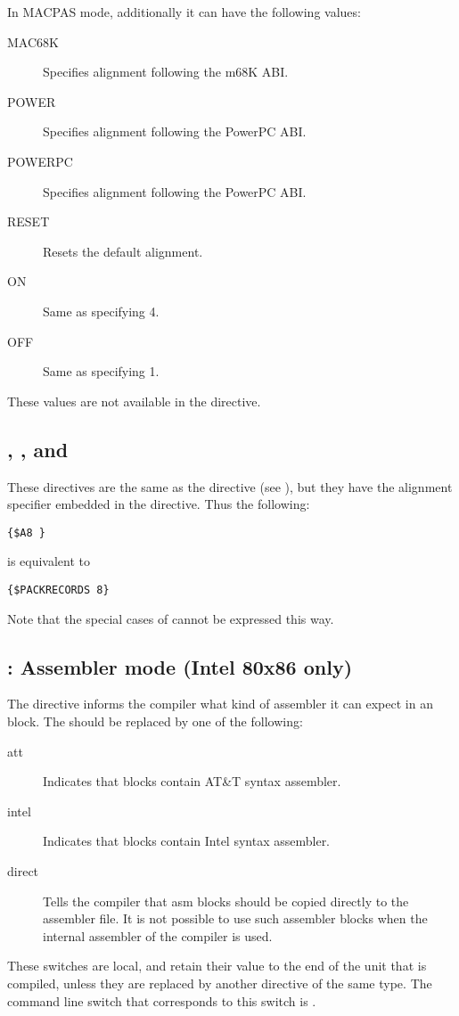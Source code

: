 In MACPAS mode, additionally it can have the following values:
\begin{description}
\item[MAC68K] Specifies alignment following the m68K ABI.
\item[POWER] Specifies alignment following the PowerPC ABI.
\item[POWERPC] Specifies alignment following the PowerPC ABI.
\item[RESET] Resets the default alignment.
\item[ON] Same as specifying 4.
\item[OFF] Same as specifying 1.
\end{description}
These values are not available in the  directive. 

\subsection{, , and }
\label{se:An}

These directives are the same as the  directive 
(see ), but they have the alignment specifier embedded in the
directive. Thus the following:
\begin{verbatim}
{$A8 }
\end{verbatim}
is equivalent to 
\begin{verbatim}
{$PACKRECORDS 8}
\end{verbatim}
Note that the special cases of  cannot be expressed this
way.

\subsection{ : Assembler mode (Intel 80x86 only)}
\label{se:AsmReader}


The  directive informs the compiler what kind of assembler
it can expect in an  block. The  should be replaced by one
of the following:
\begin{description}
\item [att\ ] Indicates that  blocks contain AT\&T syntax assembler.
\item [intel\ ] Indicates that  blocks contain Intel syntax
assembler.
\item [direct\ ] Tells the compiler that asm blocks should be copied
directly to the assembler file. It is not possible to use such assembler
blocks when the internal assembler of the compiler is used.
\end{description}
These switches are local, and retain their value to the end of the unit that
is compiled, unless they are replaced by another directive of the same type.
The command line switch that corresponds to this switch is .

